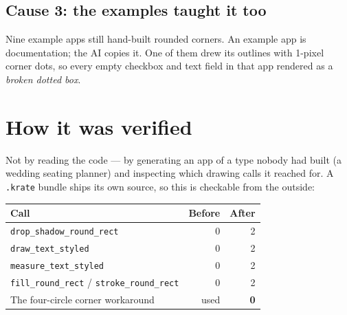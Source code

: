 \documentclass[11pt,a4paper]{report}
\begin{document}
\subsection{Cause 3: the examples taught it too}

Nine example apps still hand-built rounded corners. An example app is
documentation; the AI copies it. One of them drew its outlines with 1-pixel
corner dots, so every empty checkbox and text field in that app rendered as
a \emph{broken dotted box}.

\begin{center}
\end{center}

\section{How it was verified}

Not by reading the code --- by generating an app of a type nobody had built
(a wedding seating planner) and inspecting which drawing calls it reached
for. A \texttt{.krate} bundle ships its own source, so this is checkable
from the outside:

\begin{center}
\begin{tabular}{lrr}
\toprule
\textbf{Call} & \textbf{Before} & \textbf{After} \\
\midrule
\texttt{drop\_shadow\_round\_rect} & 0 & 2 \\
\texttt{draw\_text\_styled} & 0 & 2 \\
\texttt{measure\_text\_styled} & 0 & 2 \\
\texttt{fill\_round\_rect} / \texttt{stroke\_round\_rect} & 0 & 2 \\
The four-circle corner workaround & used & \textbf{0} \\
\bottomrule
\end{tabular}
\end{center}
\end{document}
